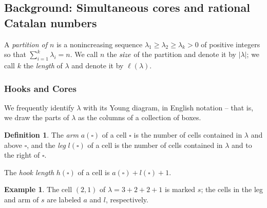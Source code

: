 \documentclass{amsart}[12pt]
\theoremstyle{definition}
\newtheorem{example}[dummy]{Example}
\newtheorem{definition}[dummy]{Definition}
\begin{document}
\subsection{Background: Simultaneous cores and rational Catalan numbers}

A \emph{partition of $n$} is a nonincreasing sequence $\lambda_1\geq \lambda_2\geq
\lambda_{k}> 0$ of positive integers so that $\sum_{i=1}^k \lambda_i=n$.  We
call $n$ the $\emph{size}$ of the partition and denote it by $|\lambda|$; we call
$k$ the \emph{length} of $\lambda$ and denote it by $\ell(\lambda)$.

\subsubsection{Hooks and Cores}


We frequently identify $\lambda$ with its Young diagram, in
English notation -- that is, we draw the parts of $\lambda$ as
the columns of a collection of boxes.

\begin{definition}
The \emph{arm} $a(\square)$ of a cell $\square$ is the number of cells contained in $\lambda$ and above  $\square$, and the \emph{leg} $l(\square)$ of a cell is the number of cells contained in $\lambda$ and to the right of $\square$.

The \emph{hook length} $h(\square)$ of a cell is $a(\square)+l(\square)+1$.
\end{definition}

\begin{example}
The cell $(2,1)$ of $\lambda=3+2+2+1$ is marked $s$; the cells in the
leg and arm of $s$ are labeled $a$ and $l$, respectively.
\begin{center}
\end{center}

\end{example}
\end{document}
